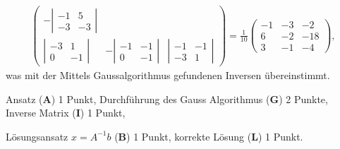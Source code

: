 \begin{loesung}
\begin{align*}
\begin{pmatrix}
-\left|\begin{matrix}-1& 5\\-3&-3\end{matrix}\right|\\
\left|\begin{matrix}-3& 1\\ 0&-1\end{matrix}\right|&
-\left|\begin{matrix}-1&-1\\ 0&-1\end{matrix}\right|&
\left|\begin{matrix}-1&-1\\-3& 1\end{matrix}\right|
\end{pmatrix}
=
\frac1{10}
\begin{pmatrix}
-1&-3& -2\\
 6&-2&-18\\
 3&-1& -4
\end{pmatrix},
\end{align*}
was mit der Mittels Gaussalgorithmus gefundenen Inversen übereinstimmt.
\end{loesung}

\begin{bewertung}
\begin{teilaufgaben}
\item
Ansatz (\textbf{A}) 1 Punkt,
Durchführung des Gauss Algorithmus (\textbf{G}) 2 Punkte,
Inverse Matrix (\textbf{I}) 1 Punkt,
\item
Lösungsansatz $x=A^{-1}b$ (\textbf{B}) 1 Punkt,
korrekte Lösung (\textbf{L}) 1 Punkt.
\end{teilaufgaben}
\end{bewertung}

